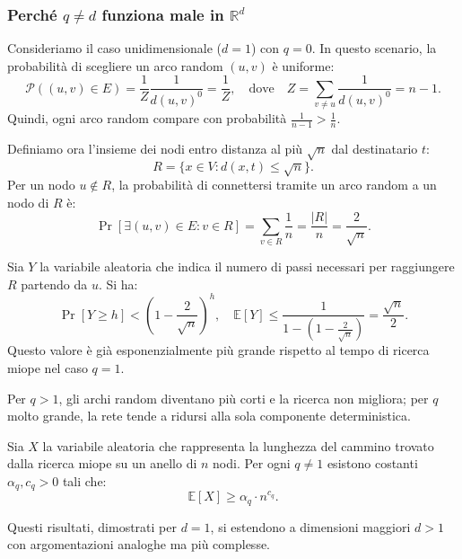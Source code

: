 \newpage
\subsubsection{Perché $q \neq d$ funziona male in $\mathbb{R}^d$}

Consideriamo il caso unidimensionale ($d = 1$) con $q = 0$. In questo scenario, la probabilità di scegliere un arco random $(u,v)$ è uniforme:
\[
\mathcal{P}((u,v) \in E) = \frac{1}{Z}\frac{1}{d(u,v)^0} = \frac{1}{Z}, \quad \text{dove} \quad Z = \sum_{v \neq u}\frac{1}{d(u,v)^0} = n - 1.
\]
Quindi, ogni arco random compare con probabilità $\frac{1}{n-1} > \frac{1}{n}$.

Definiamo ora l'insieme dei nodi entro distanza al più $\sqrt{n}$ dal destinatario $t$:
\[
R = \{ x \in V : d(x,t) \leq \sqrt{n} \}.
\]
Per un nodo $u \notin R$, la probabilità di connettersi tramite un arco random a un nodo di $R$ è:
\[
\Pr[\exists (u,v) \in E : v \in R] = \sum_{v \in R} \frac{1}{n} = \frac{|R|}{n} = \frac{2}{\sqrt{n}}.
\]

Sia $Y$ la variabile aleatoria che indica il numero di passi necessari per raggiungere $R$ partendo da $u$. Si ha:
\[
\Pr[Y \geq h] < \left(1 - \frac{2}{\sqrt{n}}\right)^h,
\quad
\mathbb{E}[Y] \leq \frac{1}{1 - \left(1 - \frac{2}{\sqrt{n}}\right)} = \frac{\sqrt{n}}{2}.
\]
Questo valore è già esponenzialmente più grande rispetto al tempo di ricerca miope nel caso $q=1$.

Per $q > 1$, gli archi random diventano più corti e la ricerca non migliora; per $q$ molto grande, la rete tende a ridursi alla sola componente deterministica.

\begin{teorema}
Sia $X$ la variabile aleatoria che rappresenta la lunghezza del cammino trovato dalla ricerca miope su un anello di $n$ nodi.  
Per ogni $q \neq 1$ esistono costanti $\alpha_q, c_q > 0$ tali che:
\[
\mathbb{E}[X] \geq \alpha_q \cdot n^{c_q}.
\]
\end{teorema}

Questi risultati, dimostrati per $d=1$, si estendono a dimensioni maggiori $d > 1$ con argomentazioni analoghe ma più complesse.
